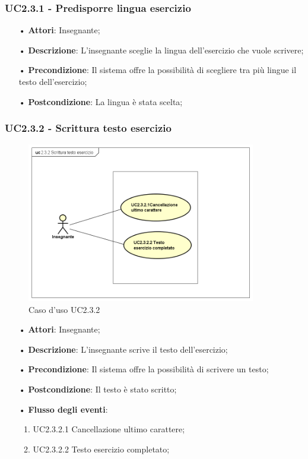 \subsubsection{UC2.3.1 - Predisporre lingua esercizio}
\begin{itemize}
	\item[•] \textbf{Attori}: Insegnante;
	\item[•] \textbf{Descrizione}: L'insegnante sceglie la lingua dell’esercizio che vuole scrivere;
	\item[•] \textbf{Precondizione}: Il sistema offre la possibilità di scegliere tra più lingue il testo 
			dell’esercizio;
	\item[•] \textbf{Postcondizione}: La lingua è stata scelta;
\end{itemize}




\subsubsection{UC2.3.2 - Scrittura testo esercizio}

\begin{figure}[H]
	\centering
	\includegraphics[width=10cm]{img/UC232.png} 
	\caption{Caso d'uso UC2.3.2}
\end{figure}

\begin{itemize}
	\item[•] \textbf{Attori}: Insegnante;
	\item[•] \textbf{Descrizione}: L'insegnante scrive il testo dell’esercizio;
	\item[•] \textbf{Precondizione}: Il sistema offre la possibilità di scrivere un testo;
	\item[•] \textbf{Postcondizione}: Il testo è stato scritto;
	\item[•] \textbf{Flusso degli eventi}:
	\begin{enumerate}
		\item UC2.3.2.1	Cancellazione ultimo carattere;
		\item UC2.3.2.2	Testo esercizio completato;
	\end{enumerate}
\end{itemize}


